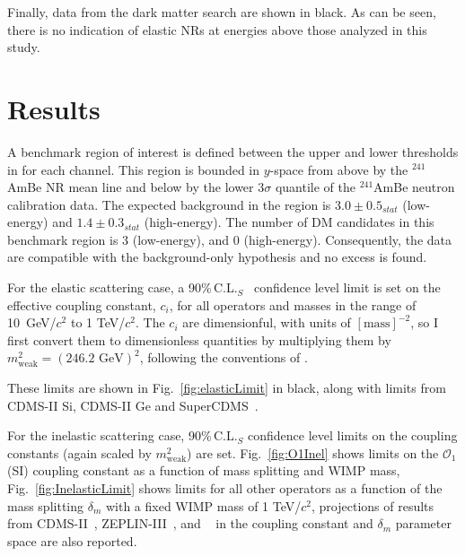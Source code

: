 Finally, data from the dark matter search are shown in black. As can be seen, there is no indication of elastic NRs at energies above those analyzed in this study.
 


\section{Results}
\label{sec:Results}

A benchmark region of interest is defined between the upper and lower thresholds in \cSi{} for each channel. This region
is bounded in $y$-space from above by the $^{241}$AmBe NR mean line and below by the lower 3$\sigma$ quantile of the $^{241}$AmBe neutron calibration data. The expected background in the region is $3.0 \pm 0.5_{stat}$ (low-energy) and $1.4 \pm 0.3_{stat}$ (high-energy). The number of DM candidates in this benchmark region is 3 (low-energy), and 0 (high-energy). Consequently, the data are compatible with the background-only hypothesis and no excess is found. 

For the elastic scattering case, a 90\%\,C.L.$_S$~\cite{cls} confidence level limit is set on the effective coupling constant, $c_i$,  for all operators and masses in the range of 10~GeV/$c^2$ to 1 TeV/$c^2$. The $c_i$ are dimensionful, with units of $[\mathrm{mass}]^{-2}$, so I first convert them to dimensionless quantities by multiplying them by $m_\mathrm{weak}^2=(246.2\text{ GeV})^2$, following the conventions of \cite{Anand:MathTools}. 

These limits are shown in Fig.~\ref{fig:elasticLimit} in black, along with limits from CDMS-II Si, CDMS-II Ge and SuperCDMS~\cite{CDMSEFT}.  


For the inelastic scattering case,  90\%\,C.L.$_S$ confidence level limits on the coupling constants 
(again scaled by $m_\mathrm{weak}^2$) are set. Fig.~\ref{fig:O1Inel} shows limits on the $\mathcal{O}_1$ (SI) coupling constant as a function of mass splitting and WIMP mass, Fig.~\ref{fig:InelasticLimit} shows limits for all other operators as a function of the mass splitting $\delta_m$ with a fixed WIMP mass of 1 TeV/$c^2$,  
projections of results from CDMS-II~\cite{CDMS_Inelastic}, ZEPLIN-III~\cite{Zepplin_Inel}, and \Xehund~\cite{XENON_Inelastic_WIMP} in the coupling constant and $\delta_m$ parameter space are also reported.
  

